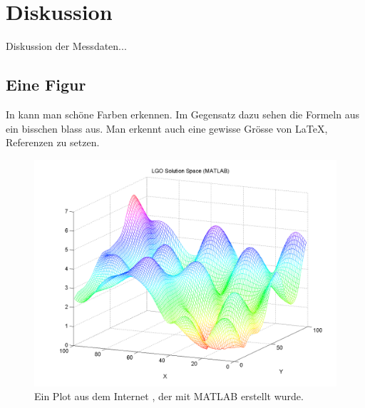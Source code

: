 \chapter{Diskussion}\label{chap:diskussion}
Diskussion der Messdaten...

\section{Eine Figur}\label{sec:eine figur}
In  kann man schöne Farben erkennen. Im Gegensatz dazu sehen die Formeln aus  ein bisschen blass aus. Man erkennt auch eine gewisse Grösse von \LaTeX, Referenzen zu setzen.
\begin{figure}[ht]
	\centering
	\includegraphics[scale=0.3]{figures/matlabgraph}
	\caption[MATLAB Plot]{Ein Plot aus dem Internet \cite{Plot}, der mit MATLAB erstellt wurde.}
	\label{fig:matlabfigur}
\end{figure}

\newpage